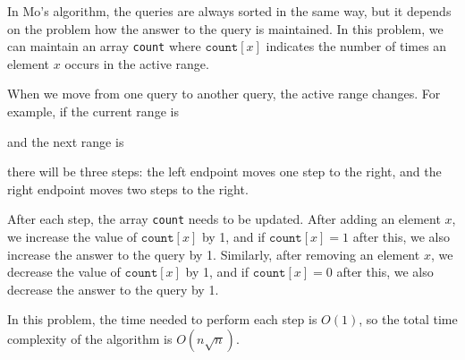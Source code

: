 In Mo's algorithm, the queries are always sorted
in the same way, but it depends on the problem
how the answer to the query is maintained.
In this problem, we can maintain an array 
\texttt{count} where $\texttt{count}[x]$
indicates the number of times an element $x$
occurs in the active range.

When we move from one query to another query,
the active range changes.
For example, if the current range is
\begin{center}
\end{center}
and the next range is
\begin{center}
\end{center}
there will be three steps:
the left endpoint moves one step to the right,
and the right endpoint moves two steps to the right.

After each step, the array \texttt{count}
needs to be updated.
After adding an element $x$,
we increase the value of 
$\texttt{count}[x]$ by 1,
and if $\texttt{count}[x]=1$ after this,
we also increase the answer to the query by 1.
Similarly, after removing an element $x$,
we decrease the value of 
$\texttt{count}[x]$ by 1,
and if $\texttt{count}[x]=0$ after this,
we also decrease the answer to the query by 1.

In this problem, the time needed to perform
each step is $O(1)$, so the total time complexity
of the algorithm is $O(n \sqrt n)$.
